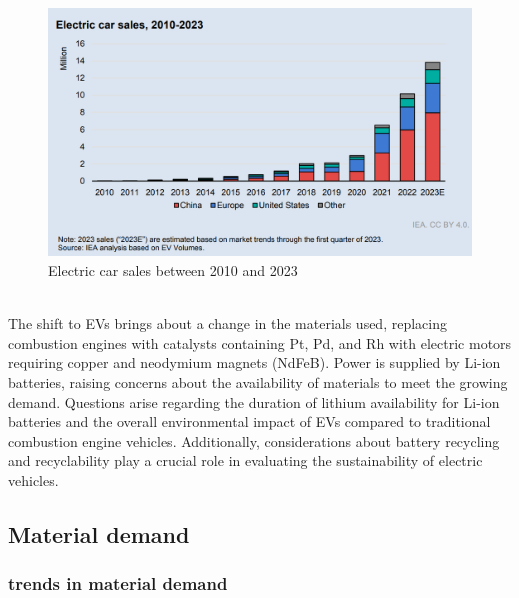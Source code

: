 \documentclass[../summary.tex]{subfiles}
\begin{document}
\begin{figure}[H]
	\centering
	\includegraphics[width=0.7\linewidth]{../images/Electric_car_sales}
	\caption{Electric car sales between 2010 and 2023}
	\label{fig:electriccarsales}
\end{figure}
\ \\
The shift to EVs brings about a change in the materials used, replacing combustion engines with catalysts containing Pt, Pd, and Rh with electric motors requiring copper and neodymium magnets (NdFeB). Power is supplied by Li-ion batteries, raising concerns about the availability of materials to meet the growing demand. Questions arise regarding the duration of lithium availability for Li-ion batteries and the overall environmental impact of EVs compared to traditional combustion engine vehicles. Additionally, considerations about battery recycling and recyclability play a crucial role in evaluating the sustainability of electric vehicles.

\subsection{Material demand}
\subsubsection{trends in material demand}
\end{document}

